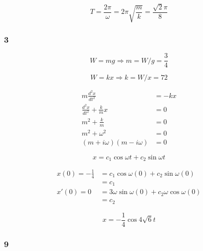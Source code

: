 \documentclass{article}
\begin{document}
\[T = \frac{2 \pi}{\omega} = 2 \pi \sqrt{\frac{m}{k}} = \frac{\sqrt{2} \pi}{8}\]

\subsubsection{3}

\[W = m g \Rightarrow m = W / g = \frac{3}{4}\]

\[W = kx \Rightarrow k = W / x = 72\]

\begin{align*}
  m \frac{d^2 x}{d t^2}               & = -kx \\
  \frac{d^2 x}{d t^2} + \frac{k}{m} x & = 0   \\
  m^2 + \frac{k}{m}                   & = 0   \\
  m^2 + \omega^2                      & = 0   \\
  (m + i \omega) (m - i \omega)       & = 0
\end{align*}

\[x = c_1 \cos \omega t + c_2 \sin \omega t\]

\begin{align*}
  x(0) = -\frac{1}{4} & = c_1 \cos \omega (0) + c_2 \sin \omega (0)             \\
                      & = c_1                                                   \\
  x'(0) = 0           & = 3 \omega \sin \omega (0) + c_2 \omega \cos \omega (0) \\
                      & = c_2
\end{align*}

\[x = -\frac{1}{4} \cos 4 \sqrt{6} t\]

\subsubsection{9}
\end{document}
